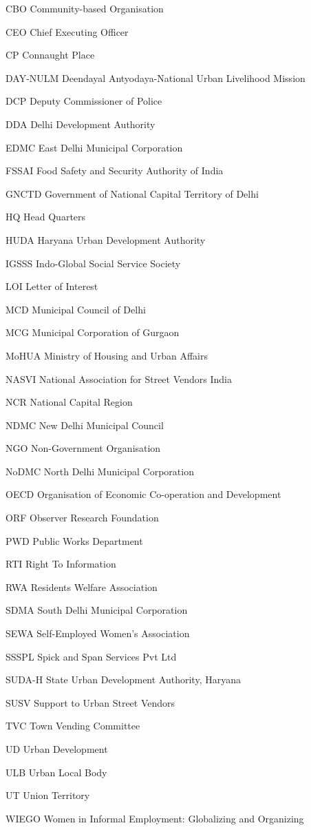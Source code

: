 \documentclass[a4paper, 12pt, twoside]{article}
\begin{document}
\begin{abbrv}

      	\item[CBO]			Community-based Organisation
	\item[CEO]			Chief Executing Officer
        	\item[CP]				Connaught Place
        	\item[DAY-NULM]		Deendayal Antyodaya-National Urban Livelihood Mission
        	\item[DCP]			Deputy Commissioner of Police
        	\item[DDA]			Delhi Development Authority
        	\item[EDMC]			East Delhi Municipal Corporation
        	\item[FSSAI]			Food Safety and Security Authority of India
	\item[GNCTD]			Government of National Capital Territory of Delhi
	\item[HQ]				Head Quarters
	\item[HUDA]			Haryana Urban Development Authority
	\item[IGSSS]			Indo-Global Social Service Society
	\item[LOI]				Letter of Interest
	\item[MCD]			Municipal Council of Delhi
	\item[MCG]			Municipal Corporation of Gurgaon
	\item[MoHUA]			Ministry of Housing and Urban Affairs
	\item[NASVI]			National Association for Street Vendors India
	\item[NCR]			National Capital Region
	\item[NDMC]			New Delhi Municipal Council
	\item[NGO]			Non-Government Organisation
	\item[NoDMC]			North Delhi Municipal Corporation
	\item[OECD]			Organisation of Economic Co-operation and Development
	\item[ORF]			Observer Research Foundation
	\item[PWD]			Public Works Department
	\item[RTI]				Right To Information
	\item[RWA]			Residents Welfare Association
	\item[SDMA]			South Delhi Municipal Corporation
	\item[SEWA]			Self-Employed Women's Association
	\item[SSSPL]			Spick and Span Services Pvt Ltd
	\item[SUDA-H]			State Urban Development Authority, Haryana
	\item[SUSV]			Support to Urban Street Vendors
	\item[TVC]			Town Vending Committee
	\item[UD]				Urban Development
	\item[ULB]				Urban Local Body
	\item[UT]				Union Territory
	\item[WIEGO]			Women in Informal Employment: Globalizing and Organizing

\end{abbrv}
\end{document}
